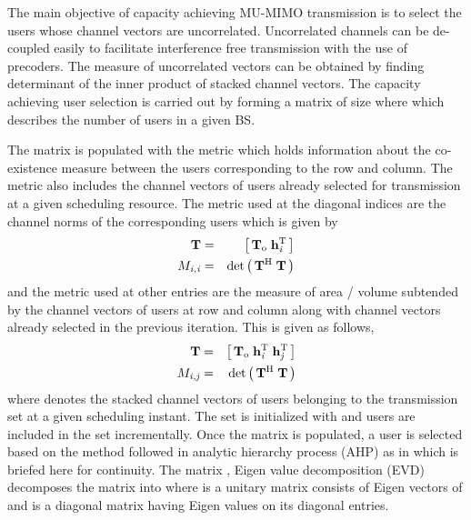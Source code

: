 
The main objective of capacity achieving MU-MIMO transmission is to select the users whose channel vectors are uncorrelated. Uncorrelated channels can be de-coupled easily to facilitate interference free transmission with the use of precoders. The measure of uncorrelated vectors can be obtained by finding determinant of the inner product of stacked  channel vectors. The capacity achieving user selection is carried out by forming a matrix  of size  where  which describes the number of users in a given BS.

The matrix  is populated with the metric which holds information about the co-existence measure between the users corresponding to the  row and  column. The metric also includes the channel vectors of users already selected for transmission at a given scheduling resource. The metric used at the diagonal indices are the channel norms of the corresponding users which is given by
\begin{eqnarray}
\mathbf{T} &=& \left [\,\mathbf{T}_{\mathrm{o}} \; \mathbf{h}_{\mathit{i}}^{\mathrm{T}} \, \right ] \\
{M}_{\mathit{i},\mathit{i}} &=& \det{\left ( \, \mathbf{T}^{\mathrm{H}} \; \mathbf{T} \, \right )} \label{mca1-e1:1}
\label{mca1-e1}
\end{eqnarray}
and the metric used at other entries are the measure of area / volume subtended by the channel vectors of users at  row and  column along with channel vectors already selected in the previous iteration. This is given as follows,
\begin{eqnarray}
\mathbf{T} &=& \left [\,\mathbf{T}_{\mathrm{o}} \; \mathbf{h}_{\mathit{i}}^{\mathrm{T}} \; \mathbf{h}_{\mathit{j}}^{\mathrm{T}} \, \right ] \\
{M}_{\mathit{i},\mathit{j}} &=& \det{\left ( \, \mathbf{T}^{\mathrm{H}} \; \mathbf{T} \, \right )} \label{mca1-e2:1}
\label{mca1-e2}
\end{eqnarray}
where  denotes the stacked channel vectors of users belonging to the transmission set  at a given scheduling instant. The set  is initialized with \me{\emptyset} and users are included in the set incrementally. Once the matrix  is populated, a user is selected based on the method followed in analytic hierarchy process (AHP) as in \cite{saaty2008decision} which is briefed here for continuity. The matrix , Eigen value decomposition (EVD) decomposes the matrix into  where  is a unitary matrix consists of Eigen vectors of  and  is a diagonal matrix having Eigen values on its diagonal entries.

